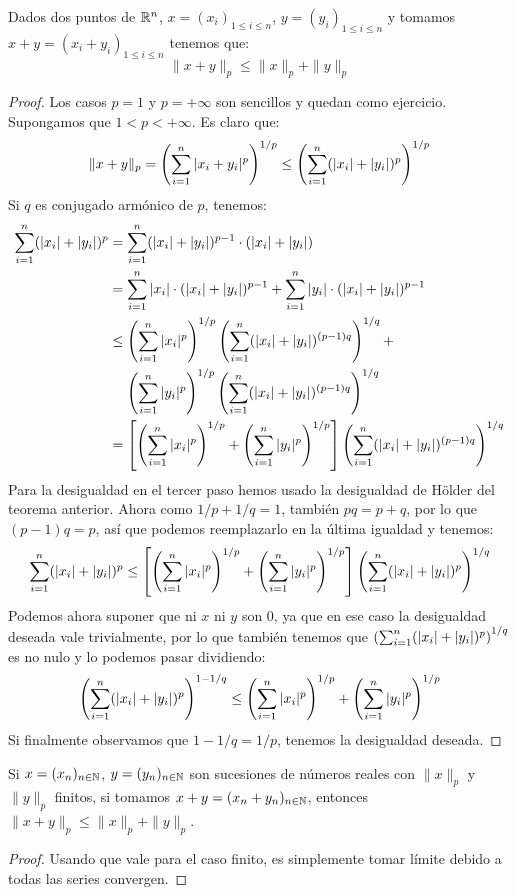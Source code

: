 \documentclass[12pt,a4paper]{book}
\begin{document}
\begin{teo} Dados dos puntos de $\mathbb{R}^n$, $x = (x_i)_{1 \leq i \leq n }$, $y = (y_i)_{1 \leq i \leq n}$ y tomamos $x+y = (x_i + y_i)_{1 \leq i \leq n }$ tenemos que:
$$ \| x + y \|_p \leq \| x \|_p + \| y \|_p $$
\begin{proof}
Los casos $p=1$ y $p=+\infty$ son sencillos y quedan como ejercicio.\\
Supongamos que $1 < p < +\infty$. Es claro que:
$$\|x + y \|_p = \left( \sum_{{i} = 1}^{n} |x_i + y_i|^p \right)^{1/p} \leq \left( \sum_{{i} = 1}^{n} (|x_i| + |y_i|)^p \right)^{1/p}$$
Si $q$ es conjugado armónico de $p$, tenemos:
\begin{align*}
\sum_{{i} = 1}^{n} (|x_i| + |y_i|)^p &= \sum_{{i} = 1}^{n} (|x_i| + |y_i|)^{p-1} \cdot (|x_i| + |y_i|)\\
&= \sum_{{i} = 1}^{n} |x_i| \cdot (|x_i| + |y_i|)^{p-1} + \sum_{{i} = 1}^{n} |y_i| \cdot (|x_i| + |y_i|)^{p-1} \\
&\leq \left(\sum_{{i} = 1}^{n} |x_i|^p\right)^{1/p}  \left( \sum_{{i} = 1}^{n} (|x_i| + |y_i|)^{(p-1)q} \right)^{1/q} + \\ &\quad\, \left(\sum_{{i} = 1}^{n} |y_i|^p\right)^{1/p} \left( \sum_{{i} = 1}^{n} (|x_i| + |y_i|)^{(p-1)q} \right)^{1/q}\\
&=\left[\left(\sum_{{i} = 1}^{n} |x_i|^p\right)^{1/p} + \left(\sum_{{i} = 1}^{n} |y_i|^p\right)^{1/p}\right] \left( \sum_{{i} = 1}^{n} (|x_i| + |y_i|)^{(p-1)q} \right)^{1/q}
\end{align*}
Para la desigualdad en el tercer paso hemos usado la desigualdad de Hölder del teorema anterior. Ahora como $1/p+1/q=1$, también $pq = p+q$, por lo que $(p-1)q=p$, así que podemos reemplazarlo en la última igualdad y tenemos:
$$ \sum_{{i} = 1}^{n} (|x_i| + |y_i|)^p \leq \left[\left(\sum_{{i} = 1}^{n} |x_i|^p\right)^{1/p} + \left(\sum_{{i} = 1}^{n} |y_i|^p\right)^{1/p}\right] \left( \sum_{{i} = 1}^{n} (|x_i| + |y_i|)^p \right)^{1/q}$$
Podemos ahora suponer que ni $x$ ni $y$ son $0$, ya que en ese caso la desigualdad deseada vale trivialmente, por lo que también tenemos que $\left( \sum_{{i} = 1}^{n} (|x_i| + |y_i|)^p \right)^{1/q}$  es no nulo y lo podemos pasar dividiendo:
$$ \left(\sum_{{i} = 1}^{n} (|x_i| + |y_i|)^p \right)^{1-1/q}\leq \left(\sum_{{i} = 1}^{n} |x_i|^p\right)^{1/p} + \left(\sum_{{i} = 1}^{n} |y_i|^p\right)^{1/p}$$
Si finalmente observamos que $1-1/q = 1/p$, tenemos la desigualdad deseada.
\end{proof}
\end{teo}
\begin{cor} Si $x = (x_n)_{{{n} \in \mathbb{N}}}$, $y=(y_n)_{{{n} \in \mathbb{N}}}$ son sucesiones de números reales con $\|x\|_p$ y $\|y\|_p$ finitos, si tomamos $ x + y = (x_n + y_n)_{{{n} \in \mathbb{N}}}$, entonces $\| x + y \|_p \leq \|x\|_p + \|y\|_p$.
\begin{proof}
Usando que vale para el caso finito, es simplemente tomar límite debido a todas las series convergen.
\end{proof}
\end{cor}
\end{document}
